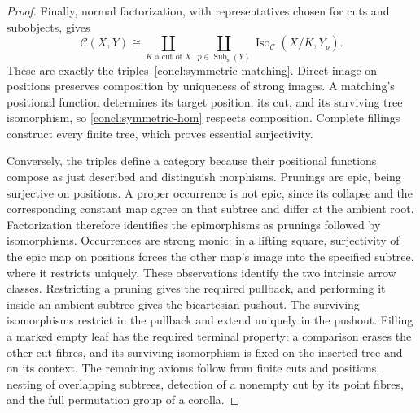 \documentclass[11pt,a4paper]{article}
\theoremstyle{plain}
\theoremstyle{definition}
\theoremstyle{remark}
\newcommand{\C}{\mathcal C}
\begin{document}
\begin{proof}
Finally, normal factorization, with representatives chosen for cuts
and subobjects, gives
\begin{equation}\label{concl:symmetric-hom}
 \C(X,Y)\cong
 \coprod_{K\text{ a cut of }X}\ \coprod_{p\in
 \operatorname{Sub}_{\mathrm{s}}(Y)}
 \operatorname{Iso}_{\C}(X/K,Y_p).
\end{equation}
These are exactly the triples~\eqref{concl:symmetric-matching}.
Direct image on positions preserves composition by uniqueness of
strong images. A matching's positional function determines its
target position, its cut, and its surviving tree isomorphism, so
\eqref{concl:symmetric-hom} respects composition. Complete fillings
construct every finite tree, which proves essential surjectivity.

Conversely, the triples define a category because their positional
functions compose as just described and distinguish morphisms.
Prunings are epic, being surjective on positions. A proper
occurrence is not epic, since its collapse and the corresponding
constant map agree on that subtree and differ at the ambient root.
Factorization therefore identifies the epimorphisms as prunings
followed by isomorphisms. Occurrences are strong monic: in a lifting
square, surjectivity of the epic map on positions forces the other
map's image into the specified subtree, where it restricts uniquely.
These observations identify the two intrinsic arrow classes.
Restricting a pruning gives the required
pullback, and performing it inside an ambient subtree gives the
bicartesian pushout. The surviving isomorphisms restrict in the
pullback and extend uniquely in the pushout. Filling a marked empty
leaf has the required terminal property: a comparison erases the
other cut fibres, and its surviving isomorphism is fixed on the
inserted tree and on its context. The remaining axioms follow from
finite cuts and positions, nesting of overlapping subtrees, detection
of a nonempty cut by its point fibres, and the full permutation group
of a corolla.
\end{proof}
\end{document}
